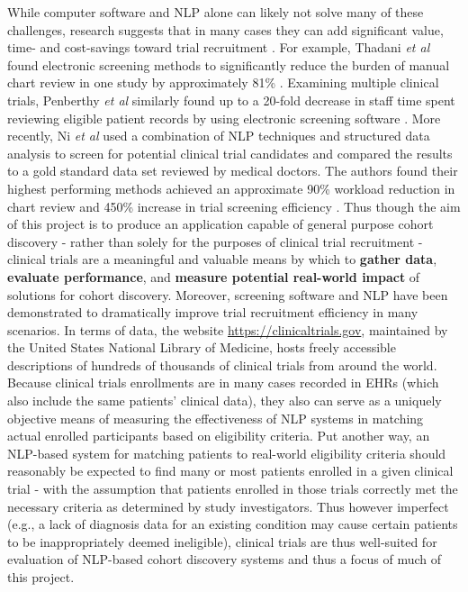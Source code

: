 \documentclass[../main.tex]{subfiles}
\begin{document}
While computer software and NLP alone can likely not solve many of these challenges, research suggests that in many cases they can add significant value, time- and cost-savings toward trial recruitment \cite{penberthy2010automated, thadani2009electronic}. For example, Thadani \textit{et al} found electronic screening methods to significantly reduce the burden of manual chart review in one study by approximately 81\% \cite{thadani2009electronic}. Examining multiple clinical trials, Penberthy \textit{et al} similarly found up to a 20-fold decrease in staff time spent reviewing eligible patient records by using electronic screening software \cite{penberthy2010automated}. More recently, Ni \textit{et al} used a combination of NLP techniques and structured data analysis to screen for potential clinical trial candidates and compared the results to a gold standard data set reviewed by medical doctors. The authors found their highest performing methods achieved an approximate 90\% workload reduction in chart review and 450\% increase in trial screening efficiency \cite{ni2015automated}. 
Thus though the aim of this project is to produce an application capable of general purpose cohort discovery - rather than solely for the purposes of clinical trial recruitment - clinical trials are a meaningful and valuable means by which to \textbf{gather data}, \textbf{evaluate performance}, and \textbf{measure potential real-world impact} of solutions for cohort discovery. Moreover, screening software and NLP have been demonstrated to dramatically improve trial recruitment efficiency in many scenarios.
In terms of data, the website \url{https://clinicaltrials.gov}, maintained by the United States National Library of Medicine, hosts freely accessible descriptions of hundreds of thousands of clinical trials from around the world. Because clinical trials enrollments are in many cases recorded in EHRs (which also include the same patients' clinical data), they also can serve as a uniquely objective means of measuring the effectiveness of NLP systems in matching actual enrolled participants based on eligibility criteria. Put another way, an NLP-based system for matching patients to real-world eligibility criteria should reasonably be expected to find many or most patients enrolled in a given clinical trial - with the assumption that patients enrolled in those trials correctly met the necessary criteria as determined by study investigators. Thus however imperfect (e.g., a lack of diagnosis data for an existing condition may cause certain patients to be inappropriately deemed ineligible), clinical trials are thus well-suited for evaluation of NLP-based cohort discovery systems and thus a focus of much of this project.
\end{document}
